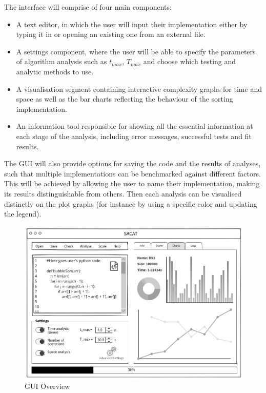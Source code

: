 \documentclass{article}
\begin{document}
            The interface will comprise of four main components:
            \begin {itemize}
                \item A text editor, in which the user will input their implementation either by typing it in or opening an existing one from an external file.
                \item A settings component, where the user will be able to specify the parameters of algorithm analysis such as $t_{max}$, $T_{max}$ and choose which testing and analytic methods to use.
                \item A visualisation segment containing interactive complexity graphs for time and space as well as the bar charts reflecting the behaviour of the sorting implementation.
                \item An information tool responsible for showing all the essential information at each stage of the analysis, including error messages, successful tests and fit results.
            \end {itemize}
            
            The GUI will also provide options for saving the code and the results of analyses, such that multiple implementations can be benchmarked against different factors. This will be achieved by allowing the user to name their implementation, making its results distinguishable from others. Then each analysis can be visualised distinctly on the plot graphs (for instance by using a specific color and updating the legend).
            
            \begin{figure}[H]
                \centering
                \includegraphics[scale=0.40]{images/gui.png}
                \caption{GUI Overview}
            \end{figure}
            
\end{document}
